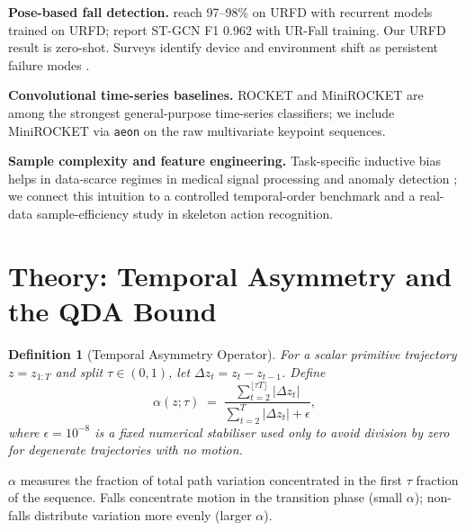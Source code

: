 \documentclass[letterpaper]{article}
\newtheorem{definition}{Definition}
\begin{document}
\textbf{Pose-based fall detection.} \citet{lin2021} reach 97--98\% on URFD with recurrent models trained on URFD; \citet{zhu2025} report ST-GCN F1 0.962 with UR-Fall training. Our URFD result is zero-shot. Surveys identify device and environment shift as persistent failure modes \citep{igual2013,mubashir2013,demiguel2017}.

\textbf{Convolutional time-series baselines.} ROCKET \citep{dempster2020} and MiniROCKET \citep{dempster2021} are among the strongest general-purpose time-series classifiers; we include MiniROCKET via \texttt{aeon} \citep{middlehurst2024} on the raw multivariate keypoint sequences.

\textbf{Sample complexity and feature engineering.} Task-specific inductive bias helps in data-scarce regimes in medical signal processing \citep{rajpurkar2017} and anomaly detection \citep{pang2021}; we connect this intuition to a controlled temporal-order benchmark and a real-data sample-efficiency study in skeleton action recognition.

\section{Theory: Temporal Asymmetry and the QDA Bound}

\begin{definition}[Temporal Asymmetry Operator]
For a scalar primitive trajectory $z = z_{1:T}$ and split $\tau \in (0,1)$, let $\Delta z_t = z_t - z_{t-1}$. Define
\begin{equation}
\alpha(z;\tau) \;=\; \frac{\sum_{t=2}^{\lfloor \tau T \rfloor} |\Delta z_t|}{\sum_{t=2}^{T} |\Delta z_t| + \epsilon},
\label{eq:alpha}
\end{equation}
where $\epsilon = 10^{-8}$ is a fixed numerical stabiliser used only to avoid division by zero for degenerate trajectories with no motion.
\end{definition}

$\alpha$ measures the fraction of total path variation concentrated in the first $\tau$ fraction of the sequence. Falls concentrate motion in the transition phase (small $\alpha$); non-falls distribute variation more evenly (larger $\alpha$).
\end{document}
